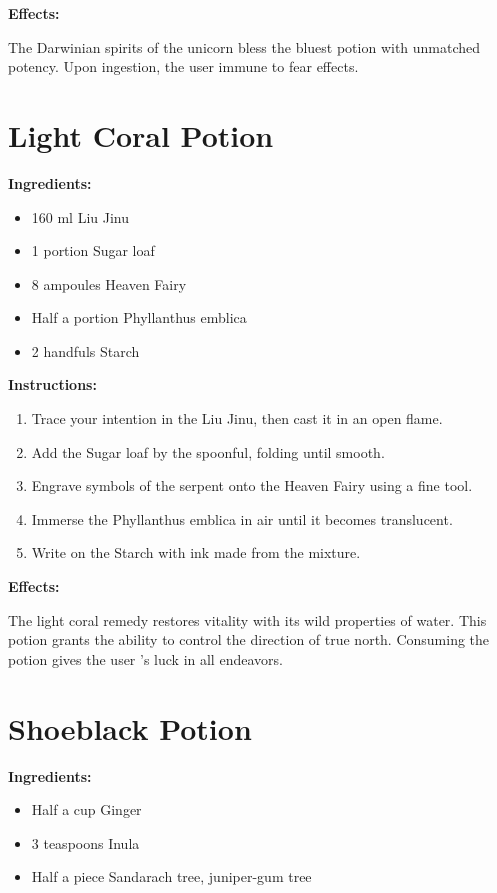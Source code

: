 \documentclass{article}
\begin{document}
\textbf{Effects:}

The Darwinian spirits of the unicorn bless the bluest potion with unmatched potency. Upon ingestion, the user immune to fear effects.

\newpage
\section*{Light Coral Potion}

\textbf{Ingredients:}

\begin{itemize}
  \item 160 ml Liu Jinu
  \item 1 portion Sugar loaf
  \item 8 ampoules Heaven Fairy
  \item Half a portion Phyllanthus emblica
  \item 2 handfuls Starch
\end{itemize}

\textbf{Instructions:}

\begin{enumerate}
  \item Trace your intention in the Liu Jinu, then cast it in an open flame.
  \item Add the Sugar loaf by the spoonful, folding until smooth.
  \item Engrave symbols of the serpent onto the Heaven Fairy using a fine tool.
  \item Immerse the Phyllanthus emblica in air until it becomes translucent.
  \item Write on the Starch with ink made from the mixture.
\end{enumerate}

\textbf{Effects:}

The light coral remedy restores vitality with its wild properties of water. This potion grants the ability to control the direction of true north. Consuming the potion gives the user 's luck in all endeavors.

\newpage
\section*{Shoeblack Potion}

\textbf{Ingredients:}

\begin{itemize}
  \item Half a cup Ginger
  \item 3 teaspoons Inula
  \item Half a piece Sandarach tree, juniper-gum tree
\end{itemize}
\end{document}
